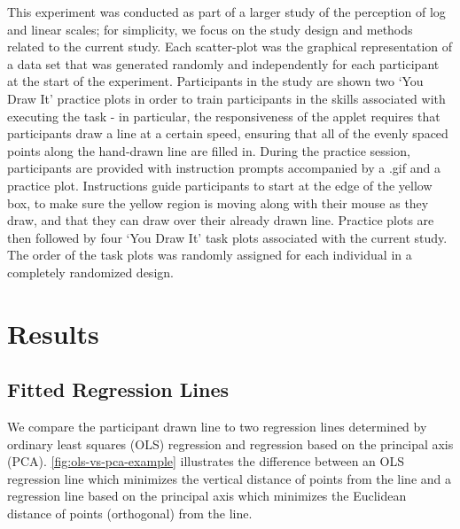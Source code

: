 \documentclass[12pt]{article}
\begin{document}
This experiment was conducted as part of a larger study of the
perception of log and linear scales; for simplicity, we focus on the
study design and methods related to the current study. Each scatter-plot
was the graphical representation of a data set that was generated
randomly and independently for each participant at the start of the
experiment. Participants in the study are shown two `You Draw It'
practice plots in order to train participants in the skills associated
with executing the task - in particular, the responsiveness of the
applet requires that participants draw a line at a certain speed,
ensuring that all of the evenly spaced points along the hand-drawn line
are filled in. During the practice session, participants are provided
with instruction prompts accompanied by a .gif and a practice plot.
Instructions guide participants to start at the edge of the yellow box,
to make sure the yellow region is moving along with their mouse as they
draw, and that they can draw over their already drawn line. Practice
plots are then followed by four `You Draw It' task plots associated with
the current study. The order of the task plots was randomly assigned for
each individual in a completely randomized design.

\hypertarget{results}{%
\section{Results}\label{results}}

\hypertarget{fitted-regression-lines}{%
\subsection{Fitted Regression Lines}\label{fitted-regression-lines}}

We compare the participant drawn line to two regression lines determined
by ordinary least squares (OLS) regression and regression based on the
principal axis (PCA). \cref{fig:ols-vs-pca-example} illustrates the
difference between an OLS regression line which minimizes the vertical
distance of points from the line and a regression line based on the
principal axis which minimizes the Euclidean distance of points
(orthogonal) from the line.
\end{document}
